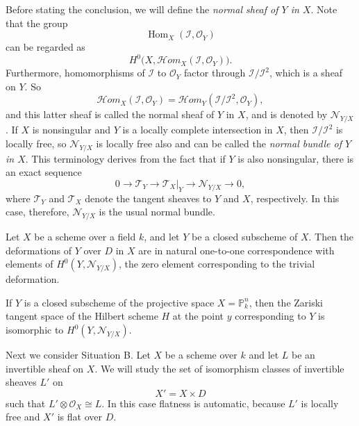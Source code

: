 \begin{definition}
\label{definition-normal-sheaf}
Before stating the conclusion, we will
define the \emph{normal sheaf of $Y$ in
$X$}. Note that the group
$$
\operatorname{Hom}_X
(\mathcal{I},\mathcal{O}_Y)
$$
can be regarded as
$$
H^0\bigl(X,
\mathcal{H}om_X
(\mathcal{I},\mathcal{O}_Y)\bigr).
$$
Furthermore, homomorphisms of $\mathcal{I}$
to $\mathcal{O}_Y$ factor through
$\mathcal{I}/\mathcal{I}^2$, which is a sheaf
on $Y$. So
$$
\mathcal{H}om_X
(\mathcal{I},\mathcal{O}_Y)
=
\mathcal{H}om_Y
(\mathcal{I}/\mathcal{I}^2,
\mathcal{O}_Y),
$$
and this latter sheaf is called the normal
sheaf of $Y$ in $X$, and is denoted by
$\mathcal{N}_{Y/X}$. If $X$ is nonsingular
and $Y$ is a locally complete intersection
in $X$, then $\mathcal{I}/\mathcal{I}^2$ is
locally free, so $\mathcal{N}_{Y/X}$ is
locally free also and can be called the
\emph{normal bundle of $Y$ in $X$}. This
terminology derives from the fact that if
$Y$ is also nonsingular, there is an exact
sequence
$$
0\longrightarrow\mathcal{T}_Y
\longrightarrow\mathcal{T}_X|_Y
\longrightarrow\mathcal{N}_{Y/X}
\longrightarrow 0,
$$
where $\mathcal{T}_Y$ and $\mathcal{T}_X$
denote the tangent sheaves to $Y$ and $X$,
respectively. In this case, therefore,
$\mathcal{N}_{Y/X}$ is the usual normal
bundle.
\end{definition}

\begin{theorem}
\label{theorem-embedded-first-order}
Let $X$ be a scheme over a field $k$, and let
$Y$ be a closed subscheme of $X$. Then the
deformations of $Y$ over $D$ in $X$ are in
natural one-to-one correspondence with
elements of $H^0(Y,\mathcal{N}_{Y/X})$, the
zero element corresponding to the trivial
deformation.
\end{theorem}

\begin{corollary}
\label{lemma-hilbert-tangent-first-order}
If $Y$ is a closed subscheme of the
projective space $X=\mathbb{P}^n_k$, then the
Zariski tangent space of the Hilbert scheme
$H$ at the point $y$ corresponding to $Y$ is
isomorphic to $H^0(Y,\mathcal{N}_{Y/X})$.
\end{corollary}

Next we consider Situation B. Let $X$ be a
scheme over $k$ and let $L$ be an invertible
sheaf on $X$. We will study the set of
isomorphism classes of invertible sheaves
$L'$ on
$$
X'=X\times D
$$
such that $L'\otimes\mathcal{O}_X\cong L$.
In this case flatness is automatic, because
$L'$ is locally free and $X'$ is flat over
$D$.

